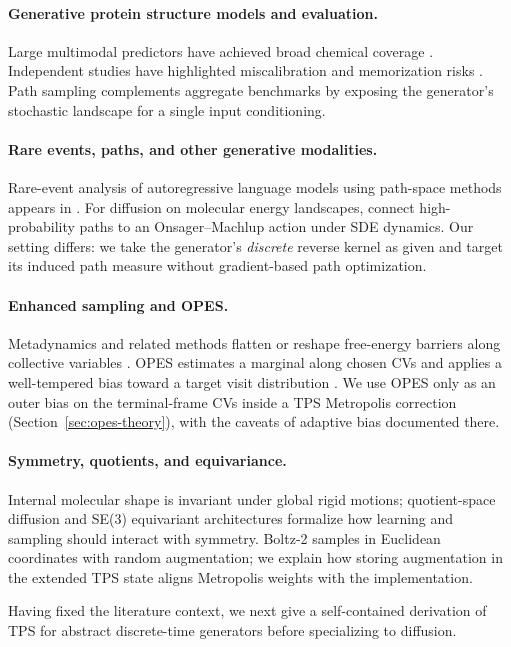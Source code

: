 \paragraph{Generative protein structure models and evaluation.}
Large multimodal predictors have achieved broad chemical coverage
\citep{alphafold3,boltz2,rfaa}. Independent studies have highlighted
miscalibration and memorization risks \citep{gopalan2025,skrinjar2025,hitawala2025}.
Path sampling complements aggregate benchmarks by exposing the generator's
stochastic landscape for a single input conditioning.

\paragraph{Rare events, paths, and other generative modalities.}
Rare-event analysis of autoregressive language models using path-space methods
appears in \citet{dorman2026}. For diffusion on molecular energy landscapes,
\citet{raja2025omtps} connect high-probability paths to an Onsager--Machlup
action under SDE dynamics. Our setting differs: we take the generator's
\emph{discrete} reverse kernel as given and target its induced path measure
without gradient-based path optimization.

\paragraph{Enhanced sampling and OPES.}
Metadynamics and related methods flatten or reshape free-energy barriers along
collective variables \citep{barducci2008}. OPES estimates a marginal along
chosen CVs and applies a well-tempered bias toward a target visit distribution
\citep{invernizzi2020,invernizzi2022}. We use OPES only as an outer bias on the
terminal-frame CVs inside a TPS Metropolis correction
(Section~\ref{sec:opes-theory}), with the caveats of adaptive bias documented
there.

\paragraph{Symmetry, quotients, and equivariance.}
Internal molecular shape is invariant under global rigid motions; quotient-space
diffusion \citep{xu2026quotient} and SE(3) equivariant architectures
\citep{yim2023se,satorras2021,batzner2022,hoogeboom2022} formalize how learning
and sampling should interact with symmetry. Boltz-2 samples in Euclidean
coordinates with random augmentation; we explain how storing augmentation in
the extended TPS state aligns Metropolis weights with the implementation.

Having fixed the literature context, we next give a self-contained derivation of
TPS for abstract discrete-time generators before specializing to diffusion.
